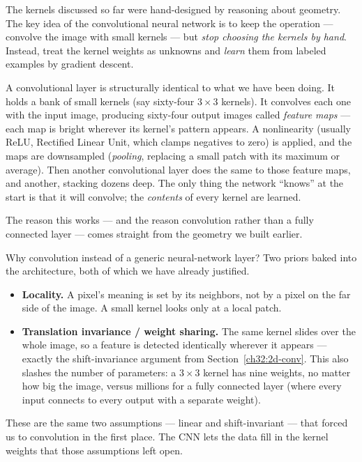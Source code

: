 The kernels discussed so far were hand-designed by reasoning about geometry. The key idea
of the convolutional neural network is to keep the
operation --- convolve the image with small kernels --- but \emph{stop choosing
the kernels by hand}. Instead, treat the kernel weights as unknowns and
\emph{learn} them from labeled examples by gradient descent.

\begin{happeningbox}
A convolutional layer is structurally identical to what we have been doing.
It holds a bank of small kernels (say sixty-four $3\times3$ kernels). It
convolves each one with the input image, producing sixty-four output images
called \emph{feature maps} --- each map is bright wherever its kernel's pattern
appears. A nonlinearity (usually ReLU, Rectified Linear Unit, which clamps negatives to zero) is applied,
and the maps are downsampled (\emph{pooling}, replacing a small patch with its maximum or average). Then another convolutional layer
does the same to those feature maps, and another, stacking dozens deep. The
only thing the network ``knows'' at the start is that it will convolve; the
\emph{contents} of every kernel are learned.
\end{happeningbox}

The reason this works --- and the reason convolution rather than a fully
connected layer --- comes straight from the geometry we built earlier.

\begin{whybox}
Why convolution instead of a generic neural-network layer? Two priors baked
into the architecture, both of which we have already justified.
\begin{itemize}
\item \textbf{Locality.} A pixel's meaning is set by its neighbors, not by a
pixel on the far side of the image. A small kernel looks only at a local patch.
\item \textbf{Translation invariance / weight sharing.} The same kernel slides
over the whole image, so a feature is detected identically wherever it appears
--- exactly the shift-invariance argument from Section~\ref{ch32:2d-conv}. This
also slashes the number of parameters: a $3\times3$ kernel has nine weights, no
matter how big the image, versus millions for a fully connected layer (where every input connects to every output with a separate weight).
\end{itemize}
These are the same two assumptions --- linear and shift-invariant --- that
forced us to convolution in the first place. The CNN lets the data fill
in the kernel weights that those assumptions left open.
\end{whybox}

